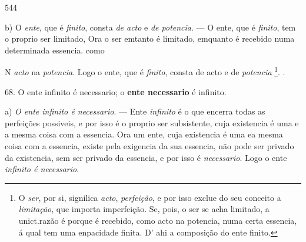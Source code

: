  544

b) O \emph{ente}, que é \emph{finito}, consta \emph{de acto} e \emph{de potencia}. --- O ente, que é \emph{finito}, tem o proprio ser limitado, Ora o ser emtanto é   limitado, emquanto é recebido numa determinada essencia. como

N   \emph{acto} na \emph{potencia}. Logo o ente, que é \emph{finito}, consta de acto e de \emph{potencia} \footnote{O \emph{ser}, por si, signilica \emph{acto}, \emph{perfeição}, e por isso exclue do seu conceito a \emph{limitação}, que importa imperfeição. Se, pois, o ser se acha limitado, a unict.razão é porque é recebido, como acto na potencia, numa certa essencia, á qual tem uma enpacidade finita. D' ahi a composição do ente finito.}. .

68. O ente infinito é necessario; o \textbf{ente necessario} é infinito.

a) \emph{O ente infinito é necessario}. --- Ente \emph{infinito} é o que encerra todas as perfeições possiveis, e por isso é o proprio ser subsistente, cuja existencia é uma e a mesma coisa com a essencia. Ora um ente, cuja existencia é uma ea mesma coisa com a essencia, existe pela exigencia da sua essencia, não pode ser privado da existencia, sem ser privado da essencia, e por isso é \emph{necessario}. Logo o ente \emph{infinito é necessario}.

